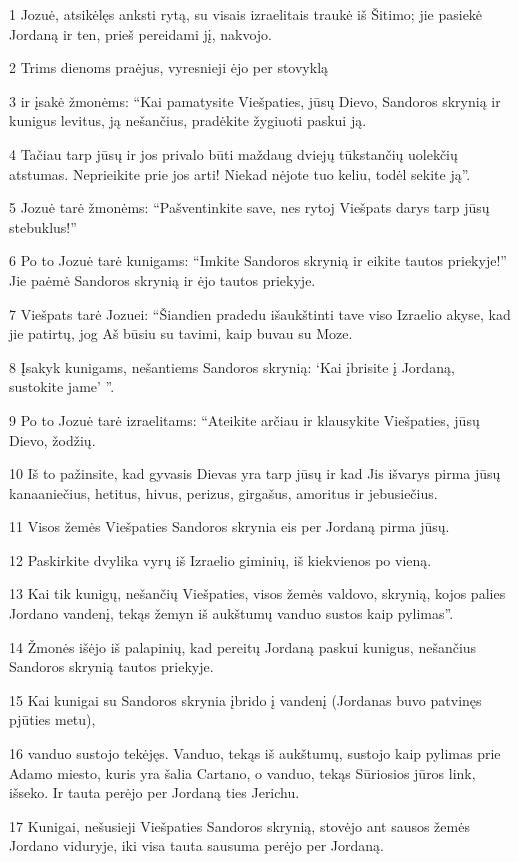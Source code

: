 \par 1 Jozuė, atsikėlęs anksti rytą, su visais izraelitais traukė iš Šitimo; jie pasiekė Jordaną ir ten, prieš pereidami jį, nakvojo. 
\par 2 Trims dienoms praėjus, vyresnieji ėjo per stovyklą 
\par 3 ir įsakė žmonėms: “Kai pamatysite Viešpaties, jūsų Dievo, Sandoros skrynią ir kunigus levitus, ją nešančius, pradėkite žygiuoti paskui ją. 
\par 4 Tačiau tarp jūsų ir jos privalo būti maždaug dviejų tūkstančių uolekčių atstumas. Neprieikite prie jos arti! Niekad nėjote tuo keliu, todėl sekite ją”. 
\par 5 Jozuė tarė žmonėms: “Pašventinkite save, nes rytoj Viešpats darys tarp jūsų stebuklus!” 
\par 6 Po to Jozuė tarė kunigams: “Imkite Sandoros skrynią ir eikite tautos priekyje!” Jie paėmė Sandoros skrynią ir ėjo tautos priekyje. 
\par 7 Viešpats tarė Jozuei: “Šiandien pradedu išaukštinti tave viso Izraelio akyse, kad jie patirtų, jog Aš būsiu su tavimi, kaip buvau su Moze. 
\par 8 Įsakyk kunigams, nešantiems Sandoros skrynią: ‘Kai įbrisite į Jordaną, sustokite jame’ ”. 
\par 9 Po to Jozuė tarė izraelitams: “Ateikite arčiau ir klausykite Viešpaties, jūsų Dievo, žodžių. 
\par 10 Iš to pažinsite, kad gyvasis Dievas yra tarp jūsų ir kad Jis išvarys pirma jūsų kanaaniečius, hetitus, hivus, perizus, girgašus, amoritus ir jebusiečius. 
\par 11 Visos žemės Viešpaties Sandoros skrynia eis per Jordaną pirma jūsų. 
\par 12 Paskirkite dvylika vyrų iš Izraelio giminių, iš kiekvienos po vieną. 
\par 13 Kai tik kunigų, nešančių Viešpaties, visos žemės valdovo, skrynią, kojos palies Jordano vandenį, tekąs žemyn iš aukštumų vanduo sustos kaip pylimas”. 
\par 14 Žmonės išėjo iš palapinių, kad pereitų Jordaną paskui kunigus, nešančius Sandoros skrynią tautos priekyje. 
\par 15 Kai kunigai su Sandoros skrynia įbrido į vandenį (Jordanas buvo patvinęs pjūties metu), 
\par 16 vanduo sustojo tekėjęs. Vanduo, tekąs iš aukštumų, sustojo kaip pylimas prie Adamo miesto, kuris yra šalia Cartano, o vanduo, tekąs Sūriosios jūros link, išseko. Ir tauta perėjo per Jordaną ties Jerichu. 
\par 17 Kunigai, nešusieji Viešpaties Sandoros skrynią, stovėjo ant sausos žemės Jordano viduryje, iki visa tauta sausuma perėjo per Jordaną.



